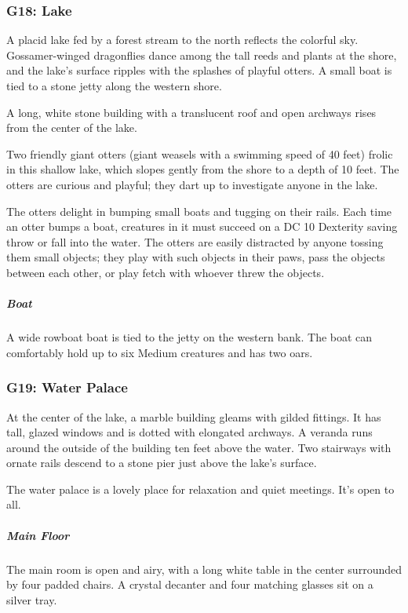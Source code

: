 \documentclass[10pt,a4paper,twoside,bg=print,twocolumn,openany,nodeprecatedcode]{dndbook}
\begin{document}
\subsubsection{G18: Lake}
\begin{DndReadAloud}{}
A placid lake fed by a forest stream to the north reflects the colorful sky. Gossamer-winged dragonflies dance among the tall reeds and plants at the shore, and the lake's surface ripples with the splashes of playful otters. A small boat is tied to a stone jetty along the western shore.

A long, white stone building with a translucent roof and open archways rises from the center of the lake.

\end{DndReadAloud}

Two friendly giant otters (giant weasels with a swimming speed of 40 feet) frolic in this shallow lake, which slopes gently from the shore to a depth of 10 feet. The otters are curious and playful; they dart up to investigate anyone in the lake.

The otters delight in bumping small boats and tugging on their rails. Each time an otter bumps a boat, creatures in it must succeed on a DC 10 Dexterity saving throw or fall into the water. The otters are easily distracted by anyone tossing them small objects; they play with such objects in their paws, pass the objects between each other, or play fetch with whoever threw the objects.

\subparagraph{Boat}
A wide rowboat boat is tied to the jetty on the western bank. The boat can comfortably hold up to six Medium creatures and has two oars.

\subsubsection{G19: Water Palace}
\begin{DndReadAloud}{}
At the center of the lake, a marble building gleams with gilded fittings. It has tall, glazed windows and is dotted with elongated archways. A veranda runs around the outside of the building ten feet above the water. Two stairways with ornate rails descend to a stone pier just above the lake's surface.

\end{DndReadAloud}

The water palace is a lovely place for relaxation and quiet meetings. It's open to all.

\subparagraph{Main Floor}
The main room is open and airy, with a long white table in the center surrounded by four padded chairs. A crystal decanter and four matching glasses sit on a silver tray.
\end{document}
